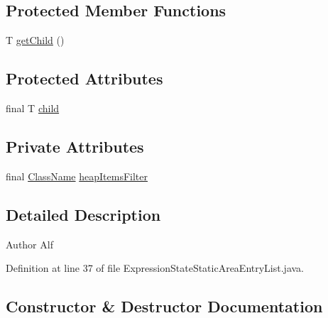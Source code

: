 \subsection*{Protected Member Functions}
\begin{DoxyCompactItemize}
\item 
T \hyperlink{classgov_1_1nasa_1_1jpf_1_1inspector_1_1server_1_1expression_1_1_expression_state_unary_operator_a150bac338d6557f79ca185d3f6ad6e06}{get\+Child} ()
\end{DoxyCompactItemize}
\subsection*{Protected Attributes}
\begin{DoxyCompactItemize}
\item 
final T \hyperlink{classgov_1_1nasa_1_1jpf_1_1inspector_1_1server_1_1expression_1_1_expression_state_unary_operator_a66041b1f569a361549e28a00f7ca5f2f}{child}
\end{DoxyCompactItemize}
\subsection*{Private Attributes}
\begin{DoxyCompactItemize}
\item 
final \hyperlink{classgov_1_1nasa_1_1jpf_1_1inspector_1_1utils_1_1expressions_1_1_class_name}{Class\+Name} \hyperlink{classgov_1_1nasa_1_1jpf_1_1inspector_1_1server_1_1expression_1_1expressions_1_1_expression_state_static_area_entry_list_a9c9eb1befb339add68a81b78db3a8703}{heap\+Items\+Filter}
\end{DoxyCompactItemize}


\subsection{Detailed Description}
\begin{DoxyAuthor}{Author}
Alf 
\end{DoxyAuthor}


Definition at line 37 of file Expression\+State\+Static\+Area\+Entry\+List.\+java.



\subsection{Constructor \& Destructor Documentation}
